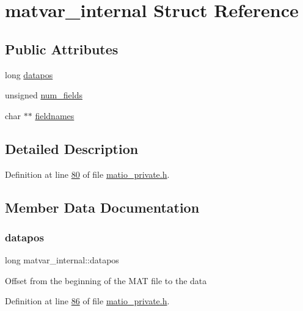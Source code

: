 \hypertarget{structmatvar__internal}{}\section{matvar\+\_\+internal Struct Reference}
\label{structmatvar__internal}
\subsection*{Public Attributes}
\begin{DoxyCompactItemize}
\item 
long \hyperlink{structmatvar__internal_afd3bfaab126a160bd6855563e1ea0a7e}{datapos}
\item 
unsigned \hyperlink{structmatvar__internal_a93fc447484f455eddf9334f2e9e411c2}{num\+\_\+fields}
\item 
char $\ast$$\ast$ \hyperlink{structmatvar__internal_a7574d000bfc98ad4860ae6590b8d4985}{fieldnames}
\end{DoxyCompactItemize}


\subsection{Detailed Description}


Definition at line \hyperlink{matio__private_8h_source_l00080}{80} of file \hyperlink{matio__private_8h_source}{matio\+\_\+private.\+h}.



\subsection{Member Data Documentation}
\mbox{\label{structmatvar__internal_afd3bfaab126a160bd6855563e1ea0a7e}} 
\subsubsection{\texorpdfstring{datapos}{datapos}}
{\footnotesize\ttfamily long matvar\+\_\+internal\+::datapos}

Offset from the beginning of the M\+AT file to the data 

Definition at line \hyperlink{matio__private_8h_source_l00086}{86} of file \hyperlink{matio__private_8h_source}{matio\+\_\+private.\+h}.

